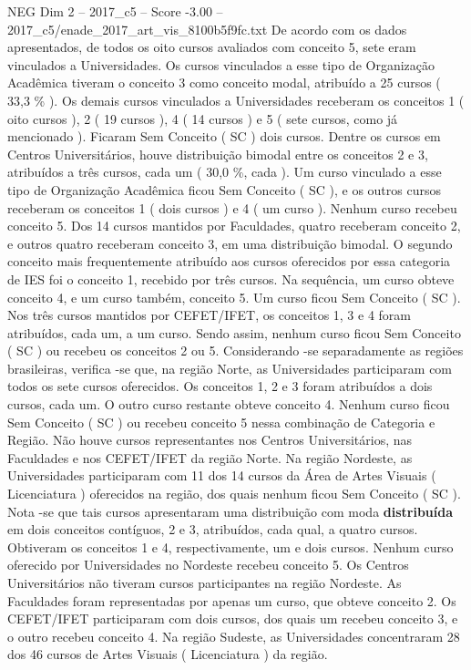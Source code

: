 \begin{textsample}{NEG Dim 2 – 2017\_c5 – Score -3.00 – 2017\_c5/enade\_2017\_art\_vis\_8100b5f9fc.txt}
De acordo com os dados apresentados, de todos os oito cursos avaliados com conceito 5, sete eram vinculados a Universidades.
Os cursos vinculados a esse tipo de Organização Acadêmica tiveram o conceito 3 como conceito modal, atribuído a 25 cursos ( 33,3 \% ).
Os demais cursos vinculados a Universidades receberam os conceitos 1 ( oito cursos ), 2 ( 19 cursos ), 4 ( 14 cursos ) e 5 ( sete cursos, como já mencionado ).
Ficaram Sem Conceito ( SC ) dois cursos.
Dentre os cursos em Centros Universitários, houve distribuição bimodal entre os conceitos 2 e 3, atribuídos a três cursos, cada um ( 30,0 \%, cada ).
Um curso vinculado a esse tipo de Organização Acadêmica ficou Sem Conceito ( SC ), e os outros cursos receberam os conceitos 1 ( dois cursos ) e 4 ( um curso ).
Nenhum curso recebeu conceito 5.
Dos 14 cursos mantidos por Faculdades, quatro receberam conceito 2, e outros quatro receberam conceito 3, em uma distribuição bimodal.
O segundo conceito mais frequentemente atribuído aos cursos oferecidos por essa categoria de IES foi o conceito 1, recebido por três cursos.
Na sequência, um curso obteve conceito 4, e um curso também, conceito 5.
Um curso ficou Sem Conceito ( SC ).
Nos três cursos mantidos por CEFET/IFET, os conceitos 1, 3 e 4 foram atribuídos, cada um, a um curso.
Sendo assim, nenhum curso ficou Sem Conceito ( SC ) ou recebeu os conceitos 2 ou 5.
Considerando -se separadamente as regiões brasileiras, verifica -se que, na região Norte, as Universidades participaram com todos os sete cursos oferecidos.
Os conceitos 1, 2 e 3 foram atribuídos a dois cursos, cada um.
O outro curso restante obteve conceito 4.
Nenhum curso ficou Sem Conceito ( SC ) ou recebeu conceito 5 nessa combinação de Categoria e Região.
Não houve cursos representantes nos Centros Universitários, nas Faculdades e nos CEFET/IFET da região Norte.
Na região Nordeste, as Universidades participaram com 11 dos 14 cursos da Área de Artes Visuais ( Licenciatura ) oferecidos na região, dos quais nenhum ficou Sem Conceito ( SC ).
Nota -se que tais cursos apresentaram uma distribuição com moda \textbf{distribuída} em dois conceitos contíguos, 2 e 3, atribuídos, cada qual, a quatro cursos.
Obtiveram os conceitos 1 e 4, respectivamente, um e dois cursos.
Nenhum curso oferecido por Universidades no Nordeste recebeu conceito 5.
Os Centros Universitários não tiveram cursos participantes na região Nordeste.
As Faculdades foram representadas por apenas um curso, que obteve conceito 2.
Os CEFET/IFET participaram com dois cursos, dos quais um recebeu conceito 3, e o outro recebeu conceito 4.
Na região Sudeste, as Universidades concentraram 28 dos 46 cursos de Artes Visuais ( Licenciatura ) da região.

\end{textsample}
